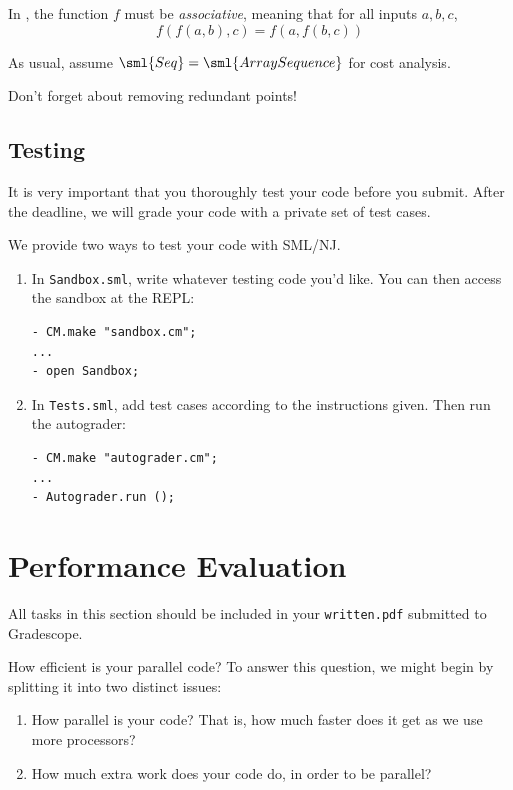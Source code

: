 \begin{important}
In , the function $f$ must be \emph{associative}, meaning that
for all inputs $a,b,c$,
\[ f(f(a,b),c) = f(a,f(b,c)) \]
\end{important}

\begin{note}
As usual, assume $\sml{Seq} = \sml{ArraySequence}$ for cost analysis.
\end{note}

\begin{note}
Don't forget about removing redundant points!
\end{note}

\subsection{Testing}

It is very important that you thoroughly test your code before you
submit. After the deadline, we will grade your code with a private set of test
cases.

We provide two ways to test your code with SML/NJ.
\begin{enumerate}
  \item
  In \texttt{Sandbox.sml}, write whatever testing code you'd like. You can then
  access the sandbox at the REPL:
\begin{verbatim}
- CM.make "sandbox.cm";
...
- open Sandbox;
\end{verbatim}
%
  \item
  In \texttt{Tests.sml}, add test cases according to the instructions given.
  Then run the autograder:
\begin{verbatim}
- CM.make "autograder.cm";
...
- Autograder.run ();
\end{verbatim}
\end{enumerate}


\section{Performance Evaluation}

\begin{note}
All tasks in this section should be included in your \texttt{written.pdf}
submitted to Gradescope.
\end{note}


How efficient is your parallel code? To answer this question, we might begin by
splitting it into two distinct issues:
%
\begin{enumerate}
\item How parallel is your code? That is, how much faster does it get as we use more processors?
\item How much extra work does your code do, in order to be parallel?
\end{enumerate}


